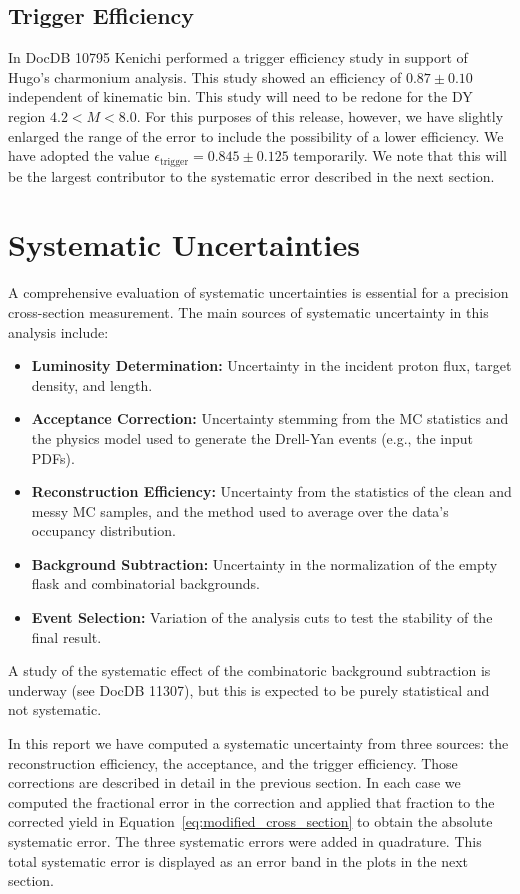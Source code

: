 \documentclass[11pt]{article}
\begin{document}
\subsection{Trigger Efficiency}

In DocDB 10795 Kenichi performed a trigger efficiency study in support of Hugo's charmonium analysis.  This study showed an efficiency of $0.87 \pm 0.10$ independent of kinematic bin.  This study will need to be redone for the DY region $4.2<M<8.0$.  For this purposes of this release, however, we have slightly enlarged the range of the error to include the possibility of a lower efficiency.  We have adopted the value $\epsilon_{\text{trigger}} = 0.845 \pm 0.125$ temporarily.  We note that this will be the largest contributor to the systematic error described in the next section.

\FloatBarrier

\section{Systematic Uncertainties}
\label{sec:systematics}
A comprehensive evaluation of systematic uncertainties is essential for a precision cross-section measurement. The main sources of systematic uncertainty in this analysis include:
\begin{itemize}
    \item \textbf{Luminosity Determination:} Uncertainty in the incident proton flux, target density, and length.
    \item \textbf{Acceptance Correction:} Uncertainty stemming from the MC statistics and the physics model used to generate the Drell-Yan events (e.g., the input PDFs).
    \item \textbf{Reconstruction Efficiency:} Uncertainty from the statistics of the clean and messy MC samples, and the method used to average over the data's occupancy distribution.
    \item \textbf{Background Subtraction:} Uncertainty in the normalization of the empty flask and combinatorial backgrounds.
    \item \textbf{Event Selection:} Variation of the analysis cuts to test the stability of the final result.
\end{itemize}
A study of the systematic effect of the combinatoric background subtraction is underway (see DocDB 11307), but this is expected to be purely statistical and not systematic.  

In this report we have computed a systematic uncertainty from three sources: the reconstruction efficiency, the acceptance, and the trigger efficiency.  Those corrections are described in detail in the previous section.  In each case we computed the fractional error in the correction and applied that fraction to the corrected yield in Equation~\ref{eq:modified_cross_section} to obtain the absolute systematic error.  The three systematic errors were added in quadrature.  This total systematic error is displayed as an error band in the plots in the next section.
\end{document}
